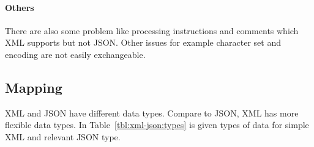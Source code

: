 \documentclass[a4paper,12pt]{article}
\begin{document}
		\paragraph{Others}
		There are also some problem like processing instructions and  comments which XML supports but not JSON. Other issues for example character set and encoding are not easily exchangeable.
		
	\subsection{Mapping}
	XML and JSON have different data types. Compare to JSON, XML has more flexible data types. In Table~\ref{tbl:xml-json:types} is given types of data for simple XML and relevant JSON type.
	\lstset{
  frame=none,
  numbers=none
}
\end{document}

